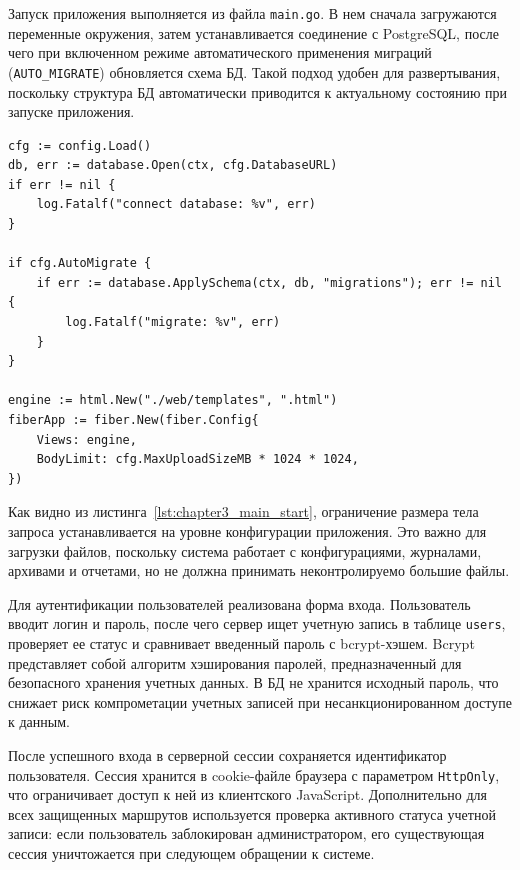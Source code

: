 Запуск приложения выполняется из файла \texttt{main.go}. В нем сначала загружаются переменные окружения, затем устанавливается соединение с PostgreSQL, после чего при включенном режиме автоматического применения миграций (\texttt{AUTO\_MIGRATE}) обновляется схема БД. Такой подход удобен для развертывания, поскольку структура БД автоматически приводится к актуальному состоянию при запуске приложения.

\begin{samepage}
\begin{lstlisting}[caption={Фрагмент инициализации веб-приложения}, label={lst:chapter3_main_start}]
cfg := config.Load()
db, err := database.Open(ctx, cfg.DatabaseURL)
if err != nil {
    log.Fatalf("connect database: %v", err)
}

if cfg.AutoMigrate {
    if err := database.ApplySchema(ctx, db, "migrations"); err != nil {
        log.Fatalf("migrate: %v", err)
    }
}

engine := html.New("./web/templates", ".html")
fiberApp := fiber.New(fiber.Config{
    Views: engine,
    BodyLimit: cfg.MaxUploadSizeMB * 1024 * 1024,
})
\end{lstlisting}
\end{samepage}

Как видно из листинга~\ref{lst:chapter3_main_start}, ограничение размера тела запроса устанавливается на уровне конфигурации приложения. Это важно для загрузки файлов, поскольку система работает с конфигурациями, журналами, архивами и отчетами, но не должна принимать неконтролируемо большие файлы.

Для аутентификации пользователей реализована форма входа. Пользователь вводит логин и пароль, после чего сервер ищет учетную запись в таблице \texttt{users}, проверяет ее статус и сравнивает введенный пароль с bcrypt-хэшем. Bcrypt представляет собой алгоритм хэширования паролей, предназначенный для безопасного хранения учетных данных. В БД не хранится исходный пароль, что снижает риск компрометации учетных записей при несанкционированном доступе к данным.

После успешного входа в серверной сессии сохраняется идентификатор пользователя. Сессия хранится в cookie-файле браузера с параметром \texttt{HttpOnly}, что ограничивает доступ к ней из клиентского JavaScript. Дополнительно для всех защищенных маршрутов используется проверка активного статуса учетной записи: если пользователь заблокирован администратором, его существующая сессия уничтожается при следующем обращении к системе.

